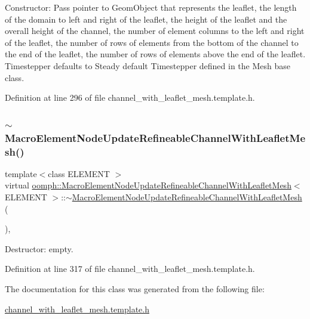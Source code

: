 Constructor\+: Pass pointer to Geom\+Object that represents the leaflet, the length of the domain to left and right of the leaflet, the height of the leaflet and the overall height of the channel, the number of element columns to the left and right of the leaflet, the number of rows of elements from the bottom of the channel to the end of the leaflet, the number of rows of elements above the end of the leaflet. Timestepper defaults to Steady default Timestepper defined in the Mesh base class. 



Definition at line 296 of file channel\+\_\+with\+\_\+leaflet\+\_\+mesh.\+template.\+h.

\mbox{\label{classoomph_1_1MacroElementNodeUpdateRefineableChannelWithLeafletMesh_af22b4288c7db553beb8658c29eb2cdaf}} 
\subsubsection{\texorpdfstring{$\sim$\+Macro\+Element\+Node\+Update\+Refineable\+Channel\+With\+Leaflet\+Mesh()}{~MacroElementNodeUpdateRefineableChannelWithLeafletMesh()}}
{\footnotesize\ttfamily template$<$class E\+L\+E\+M\+E\+NT $>$ \\
virtual \hyperlink{classoomph_1_1MacroElementNodeUpdateRefineableChannelWithLeafletMesh}{oomph\+::\+Macro\+Element\+Node\+Update\+Refineable\+Channel\+With\+Leaflet\+Mesh}$<$ E\+L\+E\+M\+E\+NT $>$\+::$\sim$\hyperlink{classoomph_1_1MacroElementNodeUpdateRefineableChannelWithLeafletMesh}{Macro\+Element\+Node\+Update\+Refineable\+Channel\+With\+Leaflet\+Mesh} (\begin{DoxyParamCaption}{ }\end{DoxyParamCaption})\hspace{0.3cm}{\ttfamily [inline]}, {\ttfamily [virtual]}}



Destructor\+: empty. 



Definition at line 317 of file channel\+\_\+with\+\_\+leaflet\+\_\+mesh.\+template.\+h.



The documentation for this class was generated from the following file\+:\begin{DoxyCompactItemize}
\item 
\hyperlink{channel__with__leaflet__mesh_8template_8h}{channel\+\_\+with\+\_\+leaflet\+\_\+mesh.\+template.\+h}\end{DoxyCompactItemize}
